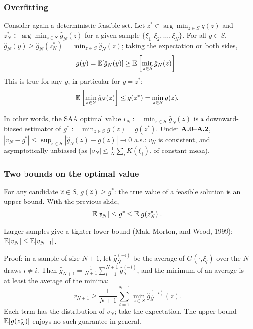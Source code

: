 \documentclass[aspectratio=169]{beamer}
\begin{document}
\begin{frame}
\frametitle{Overfitting}

Consider again a deterministic feasible set.
Let $z^* \in \arg\min_{z \in S} g(z)$ and $z^*_N  \in \arg\min_{z \in S} \hat{g}_N (z)$  for a given sample $\lbrace \xi_1, \xi_2, \ldots, \xi_N \rbrace$.
For all $y \in S$, $\hat{g}_N(y) \geq \hat{g}_N(z^*_N) = \min_{z \in S} \hat{g}_N(z)$; taking the expectation on both sides,
$$
g(y) = {\mathbb{E}}[\hat{g}_N(y)] \geq  {\mathbb{E}}\left[ \min_{z \in S} \hat{g}_N(z) \right].
$$
This is true for any $y$, in particular for $y = z^*$:
$$
{\mathbb{E}}\left[ \min_{z \in S} \hat{g}_N(z) \right] \leq g(z^*) = \min_{z \in S} g(z).
$$

In other words, the SAA optimal value $v_N := \min_{z \in S} \hat{g}_N(z)$ is a {\red downward-biased} estimator of $g^* := \min_{z \in S} g(z) = g(z^*)$.
Under \textbf{A.0}--\textbf{A.2}, $|v_N - g^*| \leq \sup_{z \in S} |\hat{g}_N(z) - g(z)| \rightarrow 0$ a.s.: $v_N$ is consistent, and asymptotically unbiased (as $|v_N| \leq \frac{1}{N}\sum_{i} K(\xi_i)$, of constant mean).

\end{frame}

\begin{frame}
\frametitle{Two bounds on the optimal value}
\small

For any candidate $\hat{z} \in S$, $g(\hat{z}) \geq g^*$: the true value of a feasible solution is an {\red upper bound}. With the previous slide,
\[
{\mathbb{E}}[v_N] \leq g^* \leq {\mathbb{E}}[g(z_N^*)].
\]

{\blue Larger samples give a tighter lower bound} (Mak, Morton, and Wood, 1999): ${\mathbb{E}}[v_N] \leq {\mathbb{E}}[v_{N+1}]$.

\smallskip

Proof: in a sample of size $N+1$, let $\hat{g}_N^{(-i)}$ be the average of $G(\cdot,\xi_l)$ over the $N$ draws $l \neq i$. Then $\hat{g}_{N+1} = \frac{1}{N+1} \sum_{i=1}^{N+1} \hat{g}_N^{(-i)}$, and the minimum of an average is at least the average of the minima:
\[
v_{N+1} \geq \frac{1}{N+1} \sum_{i=1}^{N+1} \min_{z \in S} \hat{g}_N^{(-i)}(z).
\]
Each term has the distribution of $v_N$; take the expectation.
The upper bound ${\mathbb{E}}[g(z_N^*)]$ enjoys no such guarantee in general.

\end{frame}
\end{document}

